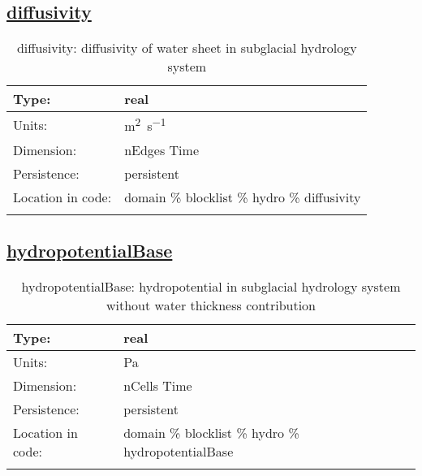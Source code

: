 \subsection[diffusivity]{\hyperref[sec:var_tab_hydro]{diffusivity}}
\label{subsec:var_sec_hydro_diffusivity}
\begin{center}
\begin{longtable}{| p{2.0in} | p{4.0in} |}
        \hline 
        Type: & real \\
        \hline 
        Units: & \si{m^{2}.s^{-1}} \\
        \hline 
        Dimension: & nEdges Time \\
        \hline 
        Persistence: & persistent \\
        \hline 
         Location in code: & domain \% blocklist \% hydro \% diffusivity \\
         \hline 
    \caption{diffusivity: diffusivity of water sheet in subglacial hydrology system}
\end{longtable}
\end{center}
\subsection[hydropotentialBase]{\hyperref[sec:var_tab_hydro]{hydropotentialBase}}
\label{subsec:var_sec_hydro_hydropotentialBase}
\begin{center}
\begin{longtable}{| p{2.0in} | p{4.0in} |}
        \hline 
        Type: & real \\
        \hline 
        Units: & \si{Pa} \\
        \hline 
        Dimension: & nCells Time \\
        \hline 
        Persistence: & persistent \\
        \hline 
         Location in code: & domain \% blocklist \% hydro \% hydropotentialBase \\
         \hline 
    \caption{hydropotentialBase: hydropotential in subglacial hydrology system without water thickness contribution}
\end{longtable}
\end{center}
